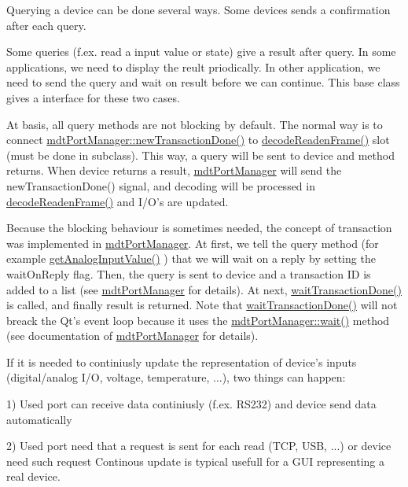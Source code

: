 Querying a device can be done several ways. Some devices sends a confirmation after each query.

Some queries (f.ex. read a input value or state) give a result after query. In some applications, we need to display the reult priodically. In other application, we need to send the query and wait on result before we can continue. This base class gives a interface for these two cases.

At basis, all query methods are not blocking by default. The normal way is to connect \hyperlink{classmdt_port_manager_a416a24db1048e9f66aef27ea810954d2}{mdtPortManager::newTransactionDone()} to \hyperlink{classmdt_device_ad211ba3be781c3db0397d5bf91f796d1}{decodeReadenFrame()} slot (must be done in subclass). This way, a query will be sent to device and method returns. When device returns a result, \hyperlink{classmdt_port_manager}{mdtPortManager} will send the newTransactionDone() signal, and decoding will be processed in \hyperlink{classmdt_device_ad211ba3be781c3db0397d5bf91f796d1}{decodeReadenFrame()} and I/O's are updated.

Because the blocking behaviour is sometimes needed, the concept of transaction was implemented in \hyperlink{classmdt_port_manager}{mdtPortManager}. At first, we tell the query method (for example \hyperlink{classmdt_device_ab828764660ba53ffce1995901ddf5a0a}{getAnalogInputValue()} ) that we will wait on a reply by setting the waitOnReply flag. Then, the query is sent to device and a transaction ID is added to a list (see \hyperlink{classmdt_port_manager}{mdtPortManager} for details). At next, \hyperlink{classmdt_device_ab937015c1a319b7234442a4cc29a02a8}{waitTransactionDone()} is called, and finally result is returned. Note that \hyperlink{classmdt_device_ab937015c1a319b7234442a4cc29a02a8}{waitTransactionDone()} will not breack the Qt's event loop because it uses the \hyperlink{classmdt_port_manager_acc5c63ad33fdd3cc153fc23e00c6e69c}{mdtPortManager::wait()} method (see documentation of \hyperlink{classmdt_port_manager}{mdtPortManager} for details).

If it is needed to continiusly update the representation of device's inputs (digital/analog I/O, voltage, temperature, ...), two things can happen:
\begin{DoxyItemize}
\item 1) Used port can receive data continiusly (f.ex. RS232) and device send data automatically
\item 2) Used port need that a request is sent for each read (TCP, USB, ...) or device need such request Continous update is typical usefull for a GUI representing a real device.
\end{DoxyItemize}


